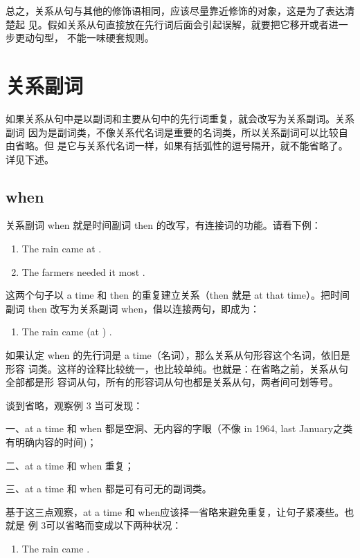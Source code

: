 总之，关系从句与其他的修饰语相同，应该尽量靠近修饰的对象，这是为了表达清楚起
见。假如关系从句直接放在先行词后面会引起误解，就要把它移开或者进一步更动句型，
不能一味硬套规则。

\section{关系副词}

如果关系从句中是以副词和主要从句中的先行词重复，就会改写为关系副词。关系副词
因为是副词类，不像关系代名词是重要的名词类，所以关系副词可以比较自由省略。但
是它与关系代名词一样，如果有括弧性的逗号隔开，就不能省略了。详见下述。

\subsection{when}

关系副词 when 就是时间副词 then 的改写，有连接词的功能。请看下例：

\begin{enumerate}
\item The rain came at .
\item The farmers needed it most .
\end{enumerate}
这两个句子以 a time 和 then 的重复建立关系（then 就是 at that time）。把时间
副词 then 改写为关系副词 when，借以连接两句，即成为：

\begin{enumerate}[resume]
\item The rain came (at ) .
\end{enumerate}
如果认定 when 的先行词是 a time（名词），那么关系从句形容这个名词，依旧是形容
词类。这样的诠释比较统一，也比较单纯。也就是：在省略之前，关系从句全部都是形
容词从句，所有的形容词从句也都是关系从句，两者间可划等号。

谈到省略，观察例 3 当可发现：

一、at a time 和 when 都是空洞、无内容的字眼（不像 in 1964, last January之类
有明确内容的时间)；

二、at a time 和 when 重复；

三、at a time 和 when 都是可有可无的副词类。

基于这三点观察，at a time 和 when应该择一省略来避免重复，让句子紧凑些。也就是
例 3可以省略而变成以下两种状况：

\begin{enumerate}[resume]
\item The rain came .
\end{enumerate}


